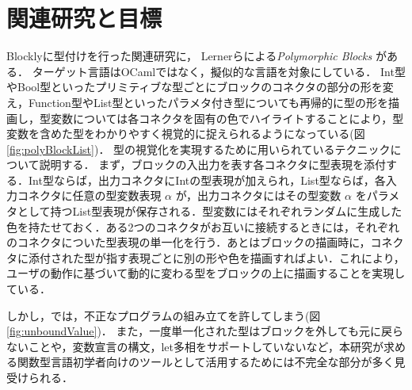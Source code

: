 \chapter{関連研究と目標}\label{chap:senko}

Blocklyに型付けを行った関連研究に，
Lernerらによる{\it Polymorphic Blocks} \cite{Typed-Blockly}がある．
ターゲット言語はOCamlではなく，擬似的な言語を対象にしている．
Int型やBool型といったプリミティブな型ごとにブロックのコネクタの部分の形を変え，Function型やList型といったパラメタ付き型についても再帰的に型の形を描画し，型変数については各コネクタを固有の色でハイライトすることにより，型変数を含めた型をわかりやすく視覚的に捉えられるようになっている(図\ref{fig:polyBlockList})．
型の視覚化を実現するために用いられているテクニックについて説明する．
まず，ブロックの入出力を表す各コネクタに型表現を添付する．Int型ならば，出力コネクタにIntの型表現が加えられ，List型ならば，各入力コネクタに任意の型変数表現 $\alpha$ が，出力コネクタにはその型変数 $\alpha$ をパラメタとして持つList型表現が保存される．型変数にはそれぞれランダムに生成した色を持たせておく．ある2つのコネクタがお互いに接続するときには，それぞれのコネクタについた型表現の単一化を行う．あとはブロックの描画時に，コネクタに添付された型が指す表現ごとに別の形や色を描画すればよい．これにより，ユーザの動作に基づいて動的に変わる型をブロックの上に描画することを実現している．

しかし，\cite{Typed-Blockly}では，不正なプログラムの組み立てを許してしまう(図\ref{fig:unboundValue})．
また，一度単一化された型はブロックを外しても元に戻らないことや，変数宣言の構文，let多相\cite{AkaHon}をサポートしていないなど，本研究が求める関数型言語初学者向けのツールとして活用するためには不完全な部分が多く見受けられる．

